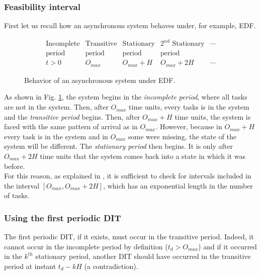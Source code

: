 \documentclass[times, 10pt,twocolumn, a4paper]{article}
\begin{document}
  \subsubsection{Feasibility interval}

  First let us recall how an asynchronous system behaves under, for example, EDF.\\

\begin{figure}[h]
$$
\begin{array}{|c|c|c|c|l}
   \text{Incomplete} & \text{Transitive} & \text{Stationary} & \text{$2^{nd}$ Stationary} & \cdots \\
   \text{period} & \text{period} & \text{period} & \text{period} & \\
  \hline
  t > 0 & O_{max} & O_{max} + H & O_{max} + 2H & \cdots
\end{array}
$$
\begin{center}
\caption{Behavior of an asynchronous system under EDF.}
\label{fig:asyncBehavior}
\end{center}
\end{figure}

As shown in Fig. \ref{fig:asyncBehavior}, the system begins in the \emph{incomplete period}, where all tasks are not in the system. Then, after $O_{max}$ time units, every tasks is in the system and the \emph{transitive period} begins. Then, after $O_{max} + H$ time units, the system is faced with the same pattern of arrival as in $O_{max}$. However, because in $O_{max} + H$ every task is in the system and in $O_{max}$ some were missing, the state of the system will be different. The \emph{stationary period} then begins. It is only after $O_{max} + 2H$ time units that the system comes back into a state in which it was before.\\

For this reason, as explained in \cite{leung1982complexity}, it is sufficient to check for intervals included in the interval $[O_{max}, O_{max} + 2H]$, which has an exponential length in the number of tasks.

\subsubsection{Using the first periodic DIT}

The first periodic DIT, if it exists, must occur in the transitive period. Indeed, it cannot occur in the incomplete period by definition ($t_d > O_{max}$) and if it occurred in the $k^{th}$ stationary period, another DIT should have occurred in the transitive period at instant $t_d - k H$ (a contradiction).\\
\end{document}
